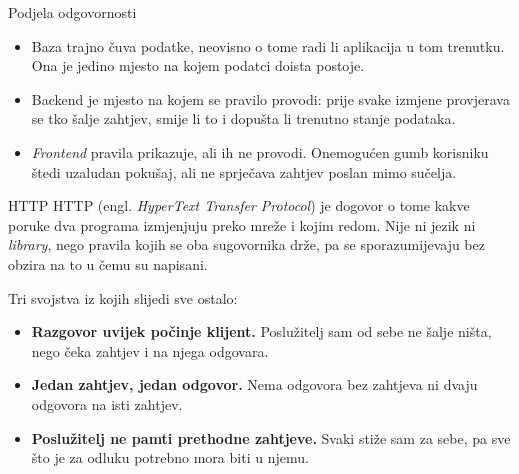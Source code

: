 \begin{frame}{Podjela odgovornosti}
\begin{itemize}
  \item Baza trajno čuva podatke, neovisno o tome radi li aplikacija u tom trenutku. Ona je jedino mjesto na kojem podatci doista postoje.
  \item Backend je mjesto na kojem se pravilo provodi: prije svake izmjene provjerava se tko šalje zahtjev, smije li to i dopušta li trenutno stanje podataka.
  \item \emph{Frontend} pravila prikazuje, ali ih ne provodi. Onemogućen gumb korisniku štedi uzaludan pokušaj, ali ne sprječava zahtjev poslan mimo sučelja.
\end{itemize}

\end{frame}


\begin{frame}{HTTP}
HTTP (engl. \emph{HyperText Transfer Protocol}) je dogovor o tome kakve poruke dva programa izmjenjuju preko mreže i kojim redom. Nije ni jezik ni \emph{library}, nego pravila kojih se oba sugovornika drže, pa se sporazumijevaju bez obzira na to u čemu su napisani.

\vspace{0.5em}
Tri svojstva iz kojih slijedi sve ostalo:

\begin{itemize}
  \item \textbf{Razgovor uvijek počinje klijent.} Poslužitelj sam od sebe ne šalje ništa, nego čeka zahtjev i na njega odgovara.
  \item \textbf{Jedan zahtjev, jedan odgovor.} Nema odgovora bez zahtjeva ni dvaju odgovora na isti zahtjev.
  \item \textbf{Poslužitelj ne pamti prethodne zahtjeve.} Svaki stiže sam za sebe, pa sve što je za odluku potrebno mora biti u njemu.
\end{itemize}

\end{frame}

